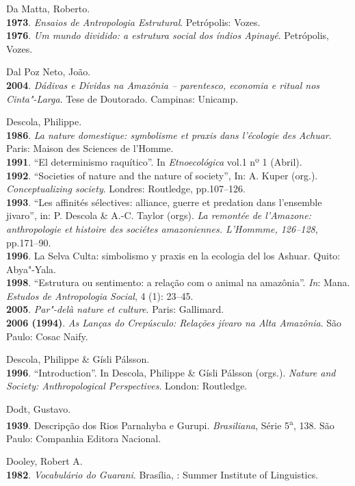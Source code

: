 \begin{Parskip}
Da Matta, Roberto.\\
\textbf{1973}. \emph{Ensaios de Antropologia Estrutural}. Petrópolis:
Vozes.\\
\textbf{1976}. \emph{Um mundo dividido: a estrutura social dos índios
Apinayé}. Petrópolis, Vozes.

Dal Poz Neto, João.\\
\textbf{2004}. \emph{Dádivas e Dívidas na Amazônia -- parentesco,
economia e ritual nos Cinta"-Larga}. Tese de Doutorado. Campinas:
Unicamp.

Descola, Philippe.\\
\textbf{1986}. \emph{La nature domestique: symbolisme et praxis dans
l'écologie des Achuar}. Paris: Maison des Sciences de l'Homme.\\
\textbf{1991}. ``El determinismo raquítico''. In \emph{Etnoecológica}
vol.1 nº 1 (Abril).\\
\textbf{1992}. ``Societies of nature and the nature of society'', In: A.
Kuper (org.). \emph{Conceptualizing society}. Londres: Routledge,
pp.107--126.\\
\textbf{1993}. ``Les affinités sélectives: alliance, guerre et predation
dans l'ensemble jivaro'', in: P. Descola \& A.-C. Taylor (orgs). \emph{La
remontée de l'Amazone: anthropologie et histoire des sociétes
amazoniennes. L'Hommme, 126--128}, pp.171--90.\\
\textbf{1996}. La Selva Culta: simbolismo y praxis en la ecologia del
los Ashuar. Quito: Abya"-Yala.\\
\textbf{1998}. ``Estrutura ou sentimento: a relação com o animal na
amazônia''. \emph{In}: Mana. \emph{Estudos de Antropologia Social}, 4 (1):
23--45.\\
\textbf{2005}. \emph{Par"-delà nature et culture}. Paris: Gallimard.\\
\textbf{2006 (1994)}. \emph{As Lanças do Crepúsculo: Relações jívaro na
Alta Amazônia}. São Paulo: Cosac Naify.

Descola, Philippe \& Gísli Pálsson.\\
\textbf{1996}. ``Introduction''. In Descola, Philippe \& Gísli Pálsson
(orgs.). \emph{Nature and Society: Anthropological Perspectives}.
London: Routledge.

Dodt, Gustavo.\\
\textbf{1939}. Descripção dos Rios Parnahyba e Gurupi.
\emph{Brasiliana}, Série 5\textsuperscript{{a}}, 138. São Paulo:
Companhia Editora Nacional.

Dooley, Robert A.\\
\textbf{1982}. \emph{Vocabulário do Guarani}. Brasília, : Summer
Institute of Linguistics.


\end{Parskip}
